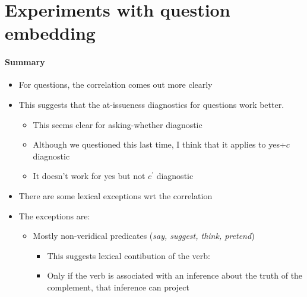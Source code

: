 \documentclass[11pt]{article}
\begin{document}
	

\section{Experiments with question embedding} %

	\paragraph{Summary} %
		\begin{itemize}
			\item For questions, the correlation comes out more clearly
			\item This suggests that the at-issueness diagnostics for questions work better.
				\begin{itemize}
					\item This seems clear for asking-whether diagnostic
					\item Although we questioned this last time, I think that it applies to yes+$c$ diagnostic
					\item It doesn't work for yes but not $c^\prime$ diagnostic
				\end{itemize}

			\item There are some lexical exceptions wrt the correlation
			\item The exceptions are:
			\begin{itemize}
				\item Mostly non-veridical predicates (\emph{say, suggest, think, pretend})
					\begin{itemize}
						\item This suggests lexical contibution of the verb:
						\item Only if the verb is associated with an inference about the truth of the complement, that inference can project
					\end{itemize}
					


\end{itemize}
\end{itemize}
\end{document}
